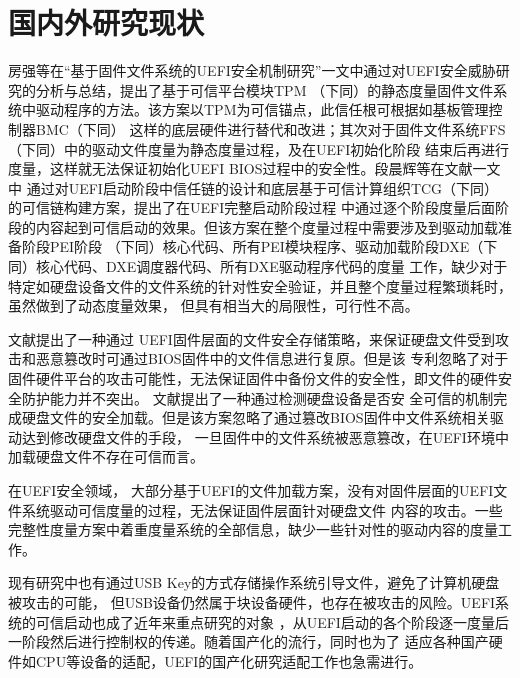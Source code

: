 \section{国内外研究现状}
房强等在“基于固件文件系统的UEFI安全机制研究”一文中通过对UEFI安全威胁研究的分析与总结\cite{chinese11}，提出了基于可信平台模块TPM
（下同）的静态度量固件文件系统中驱动程序的方法。该方案以TPM为可信锚点，此信任根可根据如基板管理控制器BMC（下同）
这样的底层硬件进行替代和改进；其次对于固件文件系统FFS（下同）中的驱动文件度量为静态度量过程，及在UEFI初始化阶段
结束后再进行度量，这样就无法保证初始化UEFI BIOS过程中的安全性。段晨辉等在文献一文中
通过对UEFI启动阶段中信任链的设计和底层基于可信计算组织TCG（下同）的可信链构建方案，提出了在UEFI完整启动阶段过程
中通过逐个阶段度量后面阶段的内容起到可信启动的效果。但该方案在整个度量过程中需要涉及到驱动加载准备阶段PEI阶段
（下同）核心代码、所有PEI模块程序、驱动加载阶段DXE（下同）核心代码、DXE调度器代码、所有DXE驱动程序代码的度量
工作，缺少对于特定如硬盘设备文件的文件系统的针对性安全验证，并且整个度量过程繁琐耗时，虽然做到了动态度量效果，
但具有相当大的局限性，可行性不高。
\par 文献提出了一种通过
UEFI固件层面的文件安全存储策略，来保证硬盘文件受到攻击和恶意篡改时可通过BIOS固件中的文件信息进行复原。但是该
专利忽略了对于固件硬件平台的攻击可能性，无法保证固件中备份文件的安全性，即文件的硬件安全防护能力并不突出。
文献提出了一种通过检测硬盘设备是否安
全可信的机制完成硬盘文件的安全加载。但是该方案忽略了通过篡改BIOS固件中文件系统相关驱动达到修改硬盘文件的手段，
一旦固件中的文件系统被恶意篡改，在UEFI环境中加载硬盘文件不存在可信而言。
\par 在UEFI安全领域\cite{english9}，
大部分基于UEFI的文件加载方案，没有对固件层面的UEFI文件系统驱动可信度量的过程，无法保证固件层面针对硬盘文件
内容的攻击\cite{english10,english11}。一些完整性度量方案中着重度量系统的全部信息，缺少一些针对性的驱动内容的度量工作\cite{english4}。
\par 现有研究中也有通过USB Key的方式存储操作系统引导文件\cite{english15}，避免了计算机硬盘被攻击的可能，
但USB设备仍然属于块设备硬件，也存在被攻击的风险。UEFI系统的可信启动也成了近年来重点研究的对象\cite{english8,english14}
，从UEFI启动的各个阶段逐一度量后一阶段然后进行控制权的传递。随着国产化的流行\cite{english19}，同时也为了
适应各种国产硬件如CPU等设备的适配，UEFI的国产化研究适配工作也急需进行。

%
%
